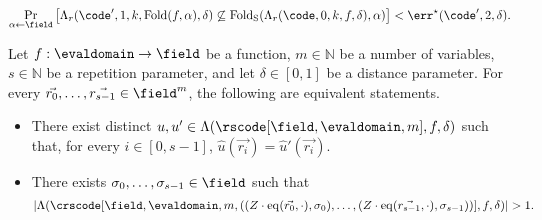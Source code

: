 \begin{lemma}\label{lemma:folding_preserves_listdecoding_base_ne_subset}
    \[
    \Pr_{\alpha \leftarrow \field} \left[
    \Lambda_{r}(\code', 1, k, \mathrm{Fold}(f, \alpha), \delta)
    \not\subseteq \mathrm{Fold_S}(\Lambda_{r}(\code, 0, k, f, \delta), \alpha)
    \right] < \err^\star(\code', 2, \delta).
    \]
\end{lemma}

\begin{lemma}\label{lemma:crs_equiv_rs_randpompt_agreement}
    Let $f : \evaldomain \rightarrow \field$ be a function, $m \in \mathbb{N}$ be a number of variables, $s \in \mathbb{N}$ be a repetition parameter, and let $\delta \in [0,1]$ be a distance parameter. For every $\vec{r_0}, \dots, \vec{r_{s-1}} \in \field^m$, the following are equivalent statements.
\begin{itemize}
    \item There exist distinct $u, u' \in \Lambda(\rscode[\field, \evaldomain, m], f, \delta)$ such that, for every $i \in [0,s-1]$, $\hat{u}(\vec{r_i}) = \hat{u}'(\vec{r_i})$.
    \item There exists $\sigma_0, \dots, \sigma_{s-1} \in \field$ such that $$\left| \Lambda(\crscode[\field, \evaldomain, m, ((Z \cdot \mathrm{eq}(\vec{r_0}, \cdot), \sigma_0), \dots, (Z \cdot \mathrm{eq}(\vec{r_{s-1}}, \cdot), \sigma_{s-1}))], f, \delta) \right| > 1.$$
\end{itemize}
\end{lemma}

